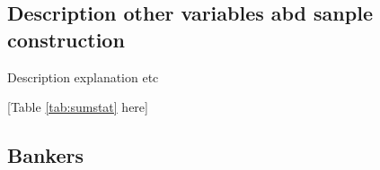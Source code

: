 
%


\subsection{Description other variables abd sanple construction}
Description explanation etc

\begin{center}
	[Table \ref{tab:sumstat} here]
\end{center}



\subsection{Bankers}

